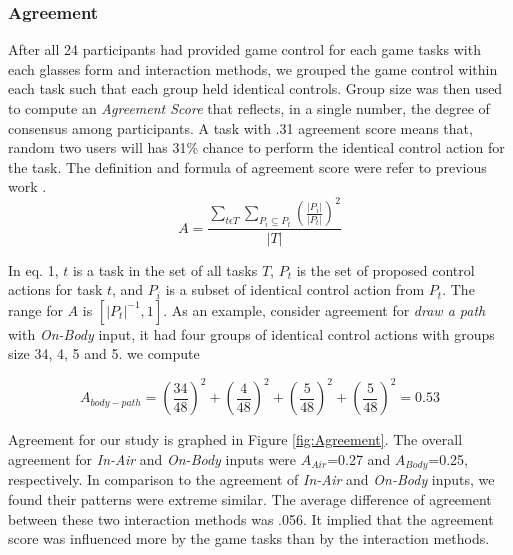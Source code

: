 \documentclass{sigchi}
\begin{document}
   \subsubsection{Agreement}
   After all 24 participants had provided game control for each game tasks with each glasses form and interaction methods, we grouped the game control within each task such that each group held identical controls. Group size was then used to compute an \emph{Agreement Score} that reflects, in a single number, the degree of consensus among participants. A task with .31 agreement score means that, random two users will has 31\% chance to perform the identical control action for the task. The definition and formula of agreement score were refer to previous work \cite{Wobbrock:2005:MGS:1056808.1057043}.
   \begin{equation}
   A = \frac{\displaystyle{\sum_{t\epsilon T }} \sum_{P_i \subseteq P_t } \left(\frac{\lvert{P_i}\rvert}{\lvert{P_t}\rvert}\right) ^ 2}{\displaystyle{\lvert{T}\rvert}}
   \end{equation}
  
   In eq. 1, $t$ is a task in the set of all tasks $T$, $P_{t}$ is the set of proposed control actions for task $t$, and $P_i$ is a subset of identical control action from $P_{t}$. The range for $A$ is $\left[\lvert{P_t}\rvert ^{-1}, 1\right]$. As an example, consider agreement for \emph{draw a path} with \emph{On-Body} input, it had four groups of identical control actions with groups size 34, 4, 5 and 5. we compute

   \begin{equation}
   A_{body-path} = \left(\frac{34}{48}\right) ^ 2  + \left(\frac{4}{48}\right) ^ 2 + \left(\frac{5}{48}\right) ^ 2 + \left(\frac{5}{48}\right) ^ 2 = 0.53
   \end{equation}

 Agreement for our study is graphed in Figure \ref{fig:Agreement}. The overall agreement for \emph{In-Air} and \emph{On-Body} inputs were $A_{Air}$=0.27 and $A_{Body}$=0.25, respectively. In comparison to the agreement of \emph{In-Air} and \emph{On-Body} inputs, we found their patterns were extreme similar. The average difference of agreement between these two interaction methods was .056. It implied that the agreement score was influenced more by the game tasks than by the interaction methods.
\end{document}
